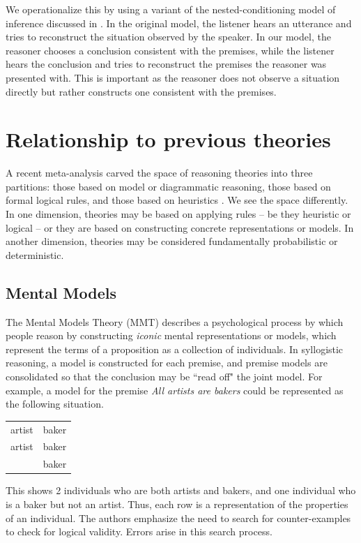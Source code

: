 \documentclass[10pt,letterpaper]{article}
\begin{document}
We operationalize this by using a variant of the nested-conditioning model of inference discussed in \cite{Goodman2013}. In the original model, the listener hears an utterance and tries to reconstruct the situation observed by the speaker. In our model, the reasoner chooses a conclusion consistent with the premises, while the listener hears the conclusion and tries to reconstruct the premises the reasoner was presented with. This is important as the reasoner does not observe a situation directly but rather constructs one consistent with the premises. 


\section{Relationship to previous theories}

A recent meta-analysis carved the space of reasoning theories into three partitions: those based on model or diagrammatic reasoning, those based on formal logical rules, and those based on heuristics \cite{Khemlani2012}. We see the space differently. In one dimension, theories may be based on applying rules -- be they heuristic or logical -- or they are based on constructing concrete representations or models. In another dimension, theories may be considered fundamentally probabilistic or deterministic. 

\subsection{Mental Models}
 The Mental Models Theory (MMT) describes a psychological process by which people reason by constructing {\em iconic} mental representations or models, which represent the terms of a proposition as a collection of individuals. In syllogistic reasoning, a model is constructed for each premise, and premise models are consolidated so that the conclusion may be ``read off" the joint model. For example, a model for the premise  \emph{All artists are bakers} could be represented as the following situation.

\begin{tabular}{l l}
artist & baker\\
artist & baker\\
 & baker\\
\end{tabular}

This shows 2 individuals who are both artists and bakers, and one individual who is a baker but not an artist. Thus, each row is a representation of the properties of an individual. The authors emphasize the need to search for counter-examples to check for logical validity. Errors arise in this search process.
\end{document}
